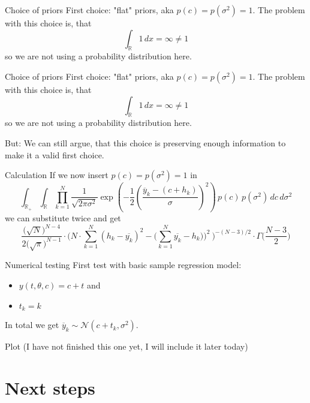 \documentclass{beamer}
\newcommand{\s}{\sigma^2}
\begin{document}
	\begin{frame}{Choice of priors}
		First choice: "flat" priors, aka $p(c) = p(\s) = 1$. The problem with this
		choice is, that
		\[
			\int_\mathbb{R} 1 \, dx = \infty \neq 1
		\]
		so we are not using a probability distribution here.
	\end{frame}

	\begin{frame}{Choice of priors}
		First choice: "flat" priors, aka $p(c) = p(\s) = 1$. The problem with this
		choice is, that
		\[
			\int_\mathbb{R} 1 \, dx = \infty \neq 1
		\]
		so we are not using a probability distribution here.
	
		\vspace{1cm}
		\alert{But}: We can still argue, that this choice is preserving enough 
		information to make it a valid first choice.
	\end{frame}

	\begin{frame}{Calculation}
		If we now insert $p(c) = p(\s) = 1$ in
		\[
			\int_{\mathbb{R}_+} \int_\mathbb{R} \prod_{k = 1}^N \frac{1}{\sqrt{2 \pi \s}} \exp\left(-\frac{1}{2} 
			\left(\frac{\overline{y}_{k} -\left( c + h_{k} \right)}{\sigma}
		 	\right)^2\right) \, p(c) \, p(\s) \, dc \, d\s
		\]
		we can substitute twice and get
		\[
			\frac{\bigl(\sqrt{N}\bigr)^{N-4}}{2\bigl(\sqrt{\pi}\bigr)^{N-1}} \cdot 
			\Biggl(N \cdot \sum_{k = 1}^N (h_k - \overline{y_k})^2 - \Biggl
			(\sum_{k = 1}^N \overline{y_k} - h_k)\Biggr)^2 \ \Biggr)^{-(N-3)/2} 
			\cdot \Gamma \biggl(\frac{N-3}{2}\biggr)
		\]
	\end{frame}

	\begin{frame}{Numerical testing}
		First test with basic sample regression model:
		\begin{itemize}
			\item $y(t,\theta,c) = c + t$ and
			\item $t_k = k$
		\end{itemize}
		In total we get $\overline{y}_k \sim \mathcal{N}(c + t_k,\s)$.
	\end{frame}

	\begin{frame}{Plot}
		(I have not finished this one yet, I will include it later today)
	\end{frame}

\section{Next steps}
\end{document}
